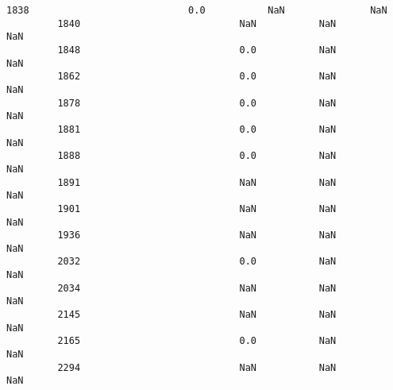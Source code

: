 \documentclass[11pt]{article}
\begin{document}
\begin{Verbatim}[commandchars=\\\{\}]
         1838                            0.0           NaN               NaN   
         1840                            NaN           NaN               NaN   
         1848                            0.0           NaN               NaN   
         1862                            0.0           NaN               NaN   
         1878                            0.0           NaN               NaN   
         1881                            0.0           NaN               NaN   
         1888                            0.0           NaN               NaN   
         1891                            NaN           NaN               NaN   
         1901                            NaN           NaN               NaN   
         1936                            NaN           NaN               NaN   
         2032                            0.0           NaN               NaN   
         2034                            NaN           NaN               NaN   
         2145                            NaN           NaN               NaN   
         2165                            0.0           NaN               NaN   
         2294                            NaN           NaN               NaN   
         

\end{Verbatim}
\end{document}
